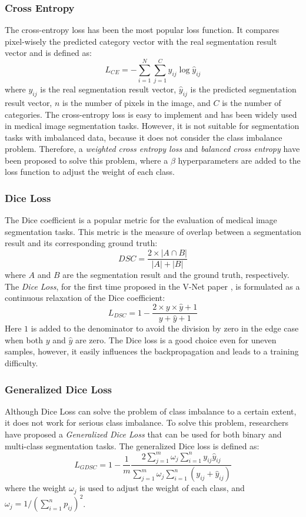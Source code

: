 \subsubsection{Cross Entropy}
The cross-entropy loss has been the most popular loss function. It compares
pixel-wisely the predicted category vector with the real segmentation result
vector and is defined as:
$$
L_{CE} = -\sum_{i=1}^{N} \sum_{j=1}^{C} y_{ij} \log \hat{y}_{ij}
$$
where $y_{ij}$ is the real segmentation result vector, $\hat{y}_{ij}$ is the
predicted segmentation result vector, $n$ is the number of pixels in the image,
and $C$ is the number of categories. The cross-entropy loss is easy to
implement and has been widely used in medical image segmentation tasks. However,
it is not suitable for segmentation tasks with imbalanced data, because it does
not consider the class imbalance problem. Therefore, a \emph{weighted cross
entropy loss} \cite{long2015fully} and \emph{balanced cross entropy} have been proposed to solve this
problem, where a $\beta$ hyperparameters are added to the loss function to adjust
the weight of each class.

\subsubsection{Dice Loss}
The Dice coefficient is a popular metric for the evaluation of medical image
segmentation tasks. This metric is the measure of overlap between a segmentation
result and its corresponding ground truth:
$$
DSC = \frac{2 \times |A \cap B|}{|A| + |B|}
$$
where $A$ and $B$ are the segmentation result and the ground truth,
respectively. The \emph{Dice Loss}, for the first time proposed in the V-Net
paper \cite{milletari2016vnet}, is formulated as a continuous relaxation of the
Dice coefficient:
$$
L_{DSC} = 1 - \frac{2 \times y \times \hat{y} + 1}{y + \hat{y} + 1}
$$
Here $1$ is added to the denominator to avoid the division by zero in the edge
case when both $y$ and $\hat{y}$ are zero. The Dice loss is a good choice even
for uneven samples, however, it easily influences the backpropagation and leads
to a training difficulty.

\subsubsection{Generalized Dice Loss}
Although Dice Loss can solve the problem of class imbalance to a certain extent,
it does not work for serious class imbalance. To solve this problem, researchers
have proposed a \emph{Generalized Dice Loss} \cite{sudre2017generalised} that
can be used for both binary and multi-class segmentation tasks. The generalized
Dice loss is defined as:
$$
L_{GDSC} = 1 - \frac{1}{m}\frac{2\sum_{j=1}^{m} \omega_j
\sum_{i=1}^{n}y_{ij}\hat{y}_{ij}}{\sum_{j=1}^{m}\omega_j\sum_{i=1}^{n}(y_{ij} +
\hat{y}_{ij})}
$$
where the weight $\omega_j$ is used to adjust the weight of each class, and $\omega_j = 1/(\sum_{i=1}^{n}p_{ij})^2$.

